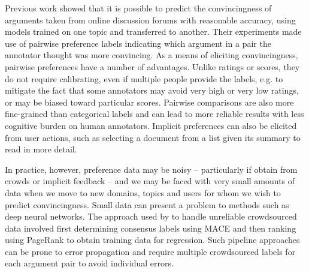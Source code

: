 Previous work \cite{habernal2016argument} showed that it is possible to predict  the
convincingness of arguments taken from online discussion forums with reasonable accuracy,
using models trained on one topic and transferred to another.
Their experiments made use of pairwise preference labels indicating which argument in a pair the annotator thought
was more convincing. 
As a means of eliciting convincingness, pairwise preferences have a number of advantages. 
Unlike ratings or scores, they do not require calibrating, even if multiple people provide the labels,
e.g. to mitigate the fact that some annotators may avoid very high or very low ratings, or may be biased toward particular scores.
Pairwise comparisons are also more fine-grained than categorical labels 
and can lead to more reliable results with less cognitive burden on human annotators\cite{kendall1948rank,kingsley2006preference}. 
Implicit preferences can also be elicited from user actions, 
such as selecting a document from a list given its summary to read in more detail\cite{joachims2002optimizing}.
  
In practice, however, preference data may be noisy -- particularly if obtain from crowds or implicit feedback -- 
and we may be faced with very small amounts of data when we move to new domains, topics and users for whom we wish 
to predict convincingness. Small data can present a problem to methods such as 
deep neural networks\cite{srivastava2014dropout}.
The approach used by \cite{habernal2016argument} to handle unreliable crowdsourced data involved 
first determining consensus labels using MACE\cite{hovy2013learning} and then ranking using PageRank
to obtain training data for regression.
Such pipeline approaches can be prone to error propagation\cite{chen2016joint} and require multiple 
crowdsourced labels 
for each argument pair to avoid individual errors. 

